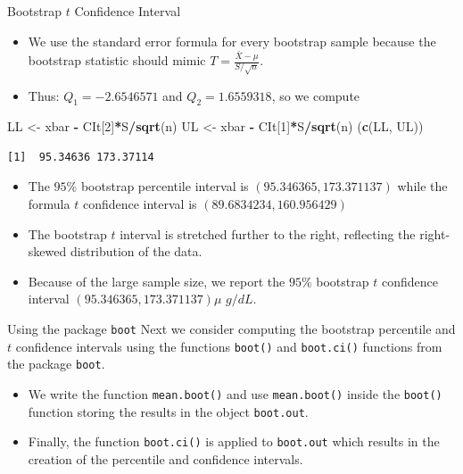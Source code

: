 \documentclass[
  ignorenonframetext,
]{beamer}
\newenvironment{Shaded}{\begin{snugshade}}{\end{snugshade}}
\newcommand{\DecValTok}[1]{\textcolor[rgb]{0.00,0.00,0.81}{#1}}
\newcommand{\FunctionTok}[1]{\textcolor[rgb]{0.13,0.29,0.53}{\textbf{#1}}}
\newcommand{\NormalTok}[1]{#1}
\newcommand{\OtherTok}[1]{\textcolor[rgb]{0.56,0.35,0.01}{#1}}
\newcommand{\SpecialCharTok}[1]{\textcolor[rgb]{0.81,0.36,0.00}{\textbf{#1}}}
\begin{document}
\begin{frame}[fragile]{Bootstrap \(t\) Confidence Interval}
\protect\hypertarget{bootstrap-t-confidence-interval-10}{}
\begin{itemize}
\item
  We use the standard error formula for every bootstrap sample because
  the bootstrap statistic should mimic
  \(T=\frac{\bar{X}-\mu}{S/\sqrt{n}}\).
\item
  Thus: \(Q_1=-2.6546571\) and \(Q_2=1.6559318\), so we compute
\end{itemize}

\small

\begin{Shaded}
\begin{Highlighting}[]
\NormalTok{LL }\OtherTok{\textless{}{-}}\NormalTok{ xbar }\SpecialCharTok{{-}}\NormalTok{ CIt[}\DecValTok{2}\NormalTok{]}\SpecialCharTok{*}\NormalTok{S}\SpecialCharTok{/}\FunctionTok{sqrt}\NormalTok{(n)}
\NormalTok{UL }\OtherTok{\textless{}{-}}\NormalTok{ xbar }\SpecialCharTok{{-}}\NormalTok{ CIt[}\DecValTok{1}\NormalTok{]}\SpecialCharTok{*}\NormalTok{S}\SpecialCharTok{/}\FunctionTok{sqrt}\NormalTok{(n)}
\NormalTok{(}\FunctionTok{c}\NormalTok{(LL, UL))}
\end{Highlighting}
\end{Shaded}

\begin{verbatim}
[1]  95.34636 173.37114
\end{verbatim}

\normalsize

\begin{itemize}
\item
  The \(95\%\) bootstrap percentile interval is
  \((95.346365, 173.371137)\) while the formula \(t\) confidence
  interval is \((89.6834234, 160.956429)\)
\item
  The bootstrap \(t\) interval is stretched further to the right,
  reflecting the right-skewed distribution of the data.
\item
  Because of the large sample size, we report the \(95\%\) bootstrap
  \(t\) confidence interval \((95.346365, 173.371137)\mu\) \(g/dL\).
\end{itemize}
\end{frame}

\begin{frame}[fragile]{Using the package \texttt{boot}}
\protect\hypertarget{using-the-package-boot}{}
Next we consider computing the bootstrap percentile and \(t\) confidence
intervals using the functions \texttt{boot()} and \texttt{boot.ci()}
functions from the package \texttt{boot}.

\begin{itemize}
\item
  We write the function \texttt{mean.boot()} and use
  \texttt{mean.boot()} inside the \texttt{boot()} function storing the
  results in the object \texttt{boot.out}.
\item
  Finally, the function \texttt{boot.ci()} is applied to
  \texttt{boot.out} which results in the creation of the percentile and
  confidence intervals.
\end{itemize}
\end{frame}
\end{document}
